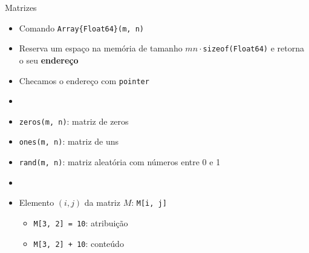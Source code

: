 \documentclass[]{beamer}
\newcommand{\code}[1]{\colorbox[gray]{0.8}{\texttt{#1}}}
\begin{document}
\begin{frame}[fragile]{Matrizes}
  
  \begin{itemize}
  \item Comando \code{Array\{Float64\}(m, n)}

  \item Reserva um espaço na memória de tamanho
    $mn\cdot$\verb+sizeof(Float64)+ e retorna o seu \textbf{endereço}

  \item Checamos o endereço com \code{pointer}

  \item[]

  \item \code{zeros(m, n)}: matriz de zeros
  \item \code{ones(m, n)}: matriz de uns
  \item \code{rand(m, n)}: matriz aleatória com números entre 0 e 1

  \item[]

  \item Elemento $(i, j)$ da matriz $M$: \code{M[i, j]}
    
    \begin{itemize}
    \item \code{M[3, 2] = 10}: atribuição
    \item \code{M[3, 2] + 10}: conteúdo
    \end{itemize}

  \end{itemize}
  
\end{frame}
\end{document}
